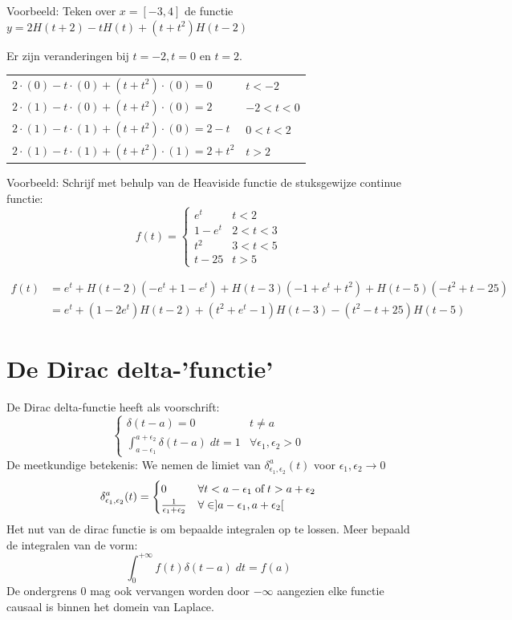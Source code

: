 \documentclass[12pt]{report}
\newcommand{\todo}[1]{
  {\color{red}\textunderscore{\textit{TODO: #1}}}
}
\newcommand{\example}[2]{
      \hrulefill
      
      Voorbeeld: #1
      
      #2
      
      \hrulefill
}
\begin{document}
\example{Teken over $x=[-3,4]$ de functie $y = 2H(t + 2) - tH(t) + (t+t^2)H(t-2)$}
{
Er zijn veranderingen bij $t = -2, t = 0$ en $t = 2$.

    \begin{tabular}{l | l}
    $2\cdot(0) - t\cdot(0) + (t+t^2)\cdot(0) = 0$ & $t < -2$\\
    $2\cdot(1) - t\cdot(0) + (t+t^2)\cdot(0) = 2$ & $-2 < t < 0$  \\
    $2\cdot(1) - t\cdot(1) + (t+t^2)\cdot(0) = 2 - t$ & $0 < t < 2$\\
    $2\cdot(1) - t\cdot(1) + (t+t^2)\cdot(1) = 2 + t^2$ & $t > 2$\\
    \end{tabular}
  \todo{graph}
}
\example{Schrijf met behulp van de Heaviside functie de stuksgewijze continue functie:
$$f(t) = \begin{cases}
          e^t & t < 2 \\
          1 - e^t & 2 < t < 3 \\
          t^2 & 3 < t < 5 \\
          t - 25 & t > 5
         \end{cases}
$$}{
\begin{equation*}
  \begin{split}
    f(t) & = e^t + H(t-2)(-e^t + 1 - e^t) + H(t-3)(-1 + e^t + t^2) + H(t - 5)(-t^2 + t - 25) \\
      & = e^t + (1-2e^t)H(t-2) + (t^2+e^t-1)H(t-3) - (t^2-t+25)H(t-5)
  \end{split}
\end{equation*}
}

\section{De Dirac delta-'functie'}
De Dirac delta-functie heeft als voorschrift:
$$
  \begin{cases}
   \delta(t - a) = 0 & t \neq a \\
   \int_{a - \epsilon_1}^{a + \epsilon_2} \delta(t - a) \; dt = 1 & \forall \epsilon_1, \epsilon_2 > 0 
  \end{cases}
$$
De meetkundige betekenis: We nemen de limiet van $\delta^a_{\epsilon_1,\epsilon_2}(t)$ voor $\epsilon_1,\epsilon_2 \rightarrow 0$
$$\delta^a_{\epsilon_1,\epsilon_2}(t) = \begin{cases}
                                         0 & \forall t < a - \epsilon_1 \; \hbox{of} \; t > a + \epsilon_2 \\
                                         \frac{1}{\epsilon_1 + \epsilon_2} & \forall \in ]a - \epsilon_1, a + \epsilon_2[
                                        \end{cases}
$$
Het nut van de dirac functie is om bepaalde integralen op te lossen. Meer bepaald de integralen van de vorm:
$$\int_{0}^{+\infty} f(t) \delta(t- a)\;dt = f(a)$$
De ondergrens 0 mag ook vervangen worden door $-\infty$ aangezien elke functie causaal is binnen het domein van Laplace.
\end{document}
